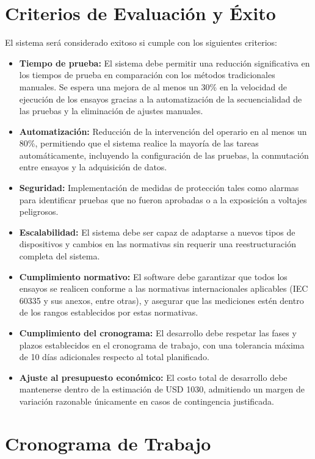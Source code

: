 \documentclass[a4paper,12pt]{article}
\begin{document}
\section{Criterios de Evaluación y Éxito}
El sistema será considerado exitoso si cumple con los siguientes criterios:
\begin{itemize}
    \item \textbf{Tiempo de prueba:} El sistema debe permitir una reducción significativa en los tiempos de prueba en comparación con los métodos tradicionales manuales. Se espera una mejora de al menos un 30\% en la velocidad de ejecución de los ensayos gracias a la automatización de la secuencialidad de las pruebas y la eliminación de ajustes manuales.
    \item \textbf{Automatización:} Reducción de la intervención del operario en al menos un 80\%, permitiendo que el sistema realice la mayoría de las tareas automáticamente, incluyendo la configuración de las pruebas, la conmutación entre ensayos y la adquisición de datos.
    \item \textbf{Seguridad:} Implementación de medidas de protección tales como alarmas para identificar pruebas que no fueron aprobadas o a la exposición a voltajes peligrosos.
    \item \textbf{Escalabilidad:} El sistema debe ser capaz de adaptarse a nuevos tipos de dispositivos y cambios en las normativas sin requerir una reestructuración completa del sistema.
    \item \textbf{Cumplimiento normativo:} El software debe garantizar que todos los ensayos se realicen conforme a las normativas internacionales aplicables (IEC 60335 y sus anexos, entre otras), y asegurar que las mediciones estén dentro de los rangos establecidos por estas normativas.
    \item \textbf{Cumplimiento del cronograma:} El desarrollo debe respetar las fases y plazos establecidos en el cronograma de trabajo, con una tolerancia máxima de 10 días adicionales respecto al total planificado.

    \item \textbf{Ajuste al presupuesto económico:} El costo total de desarrollo debe mantenerse dentro de la estimación de USD 1030, admitiendo un margen de variación razonable únicamente en casos de contingencia justificada.
\end{itemize}

\section{Cronograma de Trabajo}
\end{document}
